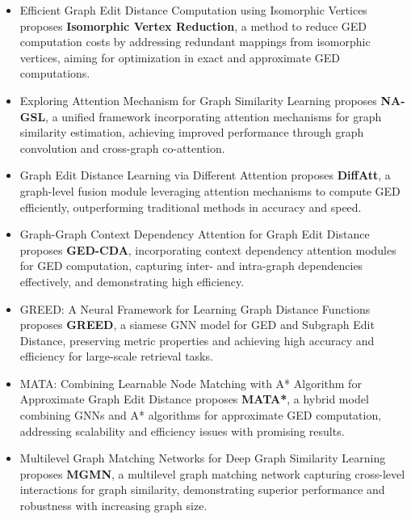 \documentclass[../Thesis.tex]{subfiles}
\begin{document}
\begin{itemize}
		\item Efficient Graph Edit Distance Computation using Isomorphic Vertices \cite{efficient_graph_edit_distance_computation_using_isomorphic_vertices} proposes \textbf{Isomorphic Vertex Reduction}, a method to reduce GED computation costs by addressing redundant mappings from isomorphic vertices, aiming for optimization in exact and approximate GED computations.
		
		\item Exploring Attention Mechanism for Graph Similarity Learning \cite{exploring_attention_mechanism_for_graph_similarity_learning} proposes \textbf{NA-GSL}, a unified framework incorporating attention mechanisms for graph similarity estimation, achieving improved performance through graph convolution and cross-graph co-attention.
		
		\item Graph Edit Distance Learning via Different Attention \cite{graph_edit_distance_learning_via_different_attention} proposes \textbf{DiffAtt}, a graph-level fusion module leveraging attention mechanisms to compute GED efficiently, outperforming traditional methods in accuracy and speed.
		
		\item Graph-Graph Context Dependency Attention for Graph Edit Distance \cite{graph_graph_context_dependency_attention_for_graph_edit_distance} proposes \textbf{GED-CDA}, incorporating context dependency attention modules for GED computation, capturing inter- and intra-graph dependencies effectively, and demonstrating high efficiency.
		
		\item GREED: A Neural Framework for Learning Graph Distance Functions \cite{greed__a_neural_framework_for_learning_graph_distance_functions} proposes \textbf{GREED}, a siamese GNN model for GED and Subgraph Edit Distance, preserving metric properties and achieving high accuracy and efficiency for large-scale retrieval tasks.
		
		\item MATA: Combining Learnable Node Matching with A* Algorithm for Approximate Graph Edit Distance \cite{mata_combining_learnable_node_matching_with_a*_algorithm_for_approximate_graph_edit_distance} proposes \textbf{MATA*}, a hybrid model combining GNNs and A* algorithms for approximate GED computation, addressing scalability and efficiency issues with promising results.
		
		\item Multilevel Graph Matching Networks for Deep Graph Similarity Learning \cite{multilevel_graph_matching_networks_for_deep_graph_similarity_learning} proposes \textbf{MGMN}, a multilevel graph matching network capturing cross-level interactions for graph similarity, demonstrating superior performance and robustness with increasing graph size.
		

\end{itemize}
\end{document}
